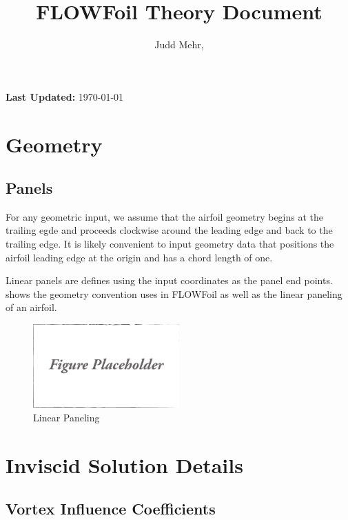 \documentclass[]{article}
\title{FLOWFoil Theory Document}
\author{Judd Mehr, }
\date{}
\begin{document}
\maketitle

\noindent \textbf{Last Updated:} \mydate\today

\section{Geometry}
\label{sec:geometry}

\subsection{Panels}
\label{ssec:panels}

For any geometric input, we assume that the airfoil geometry begins at the trailing egde and proceeds clockwise around the leading edge and back to the trailing edge.
It is likely convenient to input geometry data that positions the airfoil leading edge at the origin and has a chord length of one.

Linear panels are defines using the input coordinates as the panel end points.
 shows the geometry convention uses in FLOWFoil as well as the linear paneling of an airfoil.

\begin{figure}[h]
	\centering
	\includegraphics[width=0.5\textwidth]{draft}
	\caption{Linear Paneling}
	\label{fig:linearpanels}
\end{figure}


\section{Inviscid Solution Details}
\label{sec:inviscidsolution}


\subsection{Vortex Influence Coefficients}
\label{ssec:vortexinfluencecoefficients}
\end{document}
